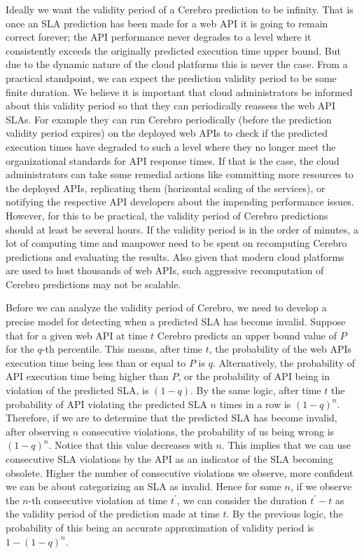 Ideally we want the validity period of a Cerebro prediction to be infinity. That is once an SLA prediction has been made for a web API it
is going to remain correct forever; the API performance never degrades to a level where it
consistently exceeds the originally predicted execution time upper bound. But due to the dynamic nature of the cloud platforms this is
never the case. From a practical standpoint, we can expect the prediction validity period to be some finite duration. We believe
it is important that cloud administrators be informed about this validity period so that they can periodically reassess the web
API SLAs. For example they can run Cerebro periodically (before the prediction validity period expires) on the deployed web APIs to check
if the predicted execution times have degraded to such a level where they no longer meet the organizational standards for API
response times. If that is the case, the cloud administrators can take some remedial actions like committing more resources to the deployed APIs,
replicating them (horizontal scaling of the services), or notifying the respective API developers about the impending performance issues. However,
for this to be practical, the validity period of Cerebro predictions should at least be several hours. If the validity period is in the order of minutes,
a lot of computing time and manpower need to be spent on recomputing Cerebro predictions and evaluating the results. Also given that
modern cloud platforms are used to host thousands of web APIs, such aggressive recomputation of Cerebro predictions may not be scalable.

Before we can analyze the validity period of Cerebro, we need to develop a precise model for detecting when a predicted SLA
has become invalid. Suppose that for a given web API at time $t$ Cerebro predicts an upper bound value of $P$ for the $q$-th percentile.
This means, after time $t$, the probability of the web APIs execution time being less than or equal to $P$ is $q$. Alternatively, the probability
of API execution time being higher than $P$, or the probability of API being in violation of the predicted SLA, is $(1-q)$. By the same logic, 
after time $t$ the probability of API violating the predicted SLA $n$ times in a row is $(1-q)^n$. 
Therefore, if we are to determine that the 
predicted SLA has become invalid, after observing $n$ consecutive violations, the probability of us being wrong is $(1-q)^n$. 
Notice that this value
decreases with $n$. This implies that we can use consecutive SLA violations by the API as an indicator of the SLA becoming
obsolete. Higher the number of consecutive violations we observe, more confident we can be about categorizing an SLA as invalid. 
Hence for some $n$, if we observe
the $n$-th consecutive violation at time $t^\prime$, we can consider the duration $t^\prime - t$ as the validity period of the prediction made 
at time $t$. By the previous logic, the probability of this being an accurate approximation of validity period is $1 - (1-q)^n$.

